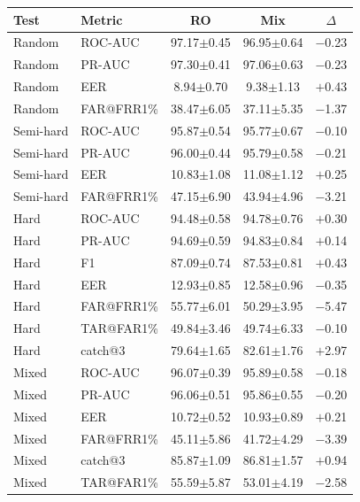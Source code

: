 \documentclass[11pt]{article}
\begin{document}
\begin{table}[!t]
\begin{minipage}[t]{0.48\textwidth}
\vspace{0.6em}
\begin{tabular}{l l c c c}
\toprule
\textbf{Test} & \textbf{Metric} & \textbf{RO} & \textbf{Mix} & \textbf{$\Delta$} \\
\midrule
Random    & ROC-AUC    & 97.17$\pm$0.45 & 96.95$\pm$0.64 & $-$0.23 \\
Random    & PR-AUC     & 97.30$\pm$0.41 & 97.06$\pm$0.63 & $-$0.23 \\
Random    & EER        & \phantom{0}8.94$\pm$0.70 & \phantom{0}9.38$\pm$1.13 & $+$0.43 \\
Random    & FAR@FRR1\% & 38.47$\pm$6.05 & 37.11$\pm$5.35 & $-$1.37 \\
\midrule
Semi-hard & ROC-AUC    & 95.87$\pm$0.54 & 95.77$\pm$0.67 & $-$0.10 \\
Semi-hard & PR-AUC     & 96.00$\pm$0.44 & 95.79$\pm$0.58 & $-$0.21 \\
Semi-hard & EER        & 10.83$\pm$1.08 & 11.08$\pm$1.12 & $+$0.25 \\
Semi-hard & FAR@FRR1\% & 47.15$\pm$6.90 & 43.94$\pm$4.96 & $-$3.21 \\
\midrule
Hard      & ROC-AUC    & 94.48$\pm$0.58 & 94.78$\pm$0.76 & $+$0.30 \\
Hard      & PR-AUC     & 94.69$\pm$0.59 & 94.83$\pm$0.84 & $+$0.14 \\
Hard      & F1         & 87.09$\pm$0.74 & 87.53$\pm$0.81 & $+$0.43 \\
Hard      & EER        & 12.93$\pm$0.85 & 12.58$\pm$0.96 & $-$0.35 \\
Hard      & FAR@FRR1\% & 55.77$\pm$6.01 & 50.29$\pm$3.95 & $-$5.47 \\
Hard      & TAR@FAR1\% & 49.84$\pm$3.46 & 49.74$\pm$6.33 & $-$0.10 \\
Hard      & catch@3    & 79.64$\pm$1.65 & 82.61$\pm$1.76 & $+$2.97 \\
\midrule
Mixed     & ROC-AUC    & 96.07$\pm$0.39 & 95.89$\pm$0.58 & $-$0.18 \\
Mixed     & PR-AUC     & 96.06$\pm$0.51 & 95.86$\pm$0.55 & $-$0.20 \\
Mixed     & EER        & 10.72$\pm$0.52 & 10.93$\pm$0.89 & $+$0.21 \\
Mixed     & FAR@FRR1\% & 45.11$\pm$5.86 & 41.72$\pm$4.29 & $-$3.39 \\
Mixed     & catch@3    & 85.87$\pm$1.09 & 86.81$\pm$1.57 & $+$0.94 \\
Mixed     & TAR@FAR1\% & 55.59$\pm$5.87 & 53.01$\pm$4.19 & $-$2.58 \\

\end{tabular}
\end{minipage}
\end{table}
\end{document}
